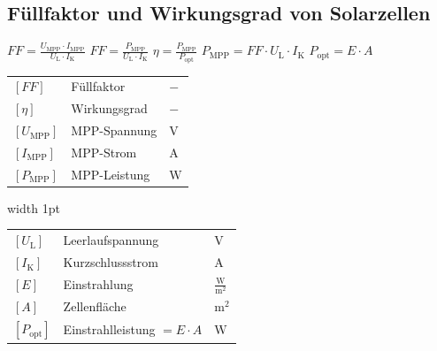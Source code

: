 \subsection{Füllfaktor und Wirkungsgrad von Solarzellen}

$
\boxed{
FF = \frac{U_{\text{MPP}} \cdot I_{\text{MPP}}}{U_{\text{L}} \cdot I_{\text{K}}} 
}$
$
\boxed{
FF = \frac{P_{\text{MPP}}}{U_{\text{L}} \cdot I_{\text{K}}}
}$
$
\boxed{
\eta = \frac{P_{\text{MPP}}}{P_{\text{opt}}} 
}$
$
\boxed{
P_{\text{MPP}} = FF \cdot U_{\mathrm{L}} \cdot I_{\mathrm{K}}
}$
$
\boxed{
P_{\text{opt}} = E \cdot A
}
$

\vspace{0.1cm}

\begin{minipage}[t]{0.44\columnwidth}
    \renewcommand{\arraystretch}{1.2}
    \begin{tabular}{@{} l p{2.4cm} l @{}}
        $[FF]$               & Füllfaktor \dotfill                            & $-$ \\
        $[\eta]$             & Wirkungsgrad \dotfill                          & $-$ \\
        $[U_{\text{MPP}}]$   & MPP-Spannung \dotfill      & $\mathrm{V}$ \\
        $[I_{\text{MPP}}]$   & MPP-Strom \dotfill         & $\mathrm{A}$ \\
        $[P_{\text{MPP}}]$   & MPP-Leistung \dotfill      & $\mathrm{W}$ \\
    \end{tabular}
\end{minipage}
\hfill
\vrule width 1pt
\hfill
\begin{minipage}[t]{0.52\columnwidth}
    \renewcommand{\arraystretch}{1.2}
    \begin{tabular}{@{} l p{3cm} l @{}}
        $[U_{\text{L}}]$     & Leerlaufspannung \dotfill                      & $\mathrm{V}$ \\
        $[I_{\text{K}}]$     & Kurzschlussstrom \dotfill                      & $\mathrm{A}$ \\
        $[E]$                & Einstrahlung \dotfill                          & $\mathrm{\frac{W}{m^2}}$ \\
        $[A]$                & Zellenfläche \dotfill                          & $\mathrm{m^2}$ \\
        $[P_{\text{opt}}]$   & Einstrahlleistung $= E \cdot A$ \dotfill & $\mathrm{W}$ \\
    \end{tabular}
\end{minipage}



